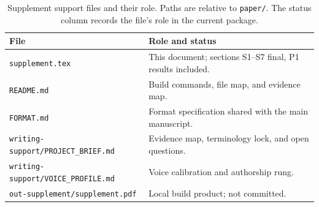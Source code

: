 \documentclass[a4paper,fleqn]{cas-sc}
\begin{document}
\begin{table}[pos=htbp]
  \centering
  \caption{Supplement support files and their role. Paths are relative to \texttt{paper/}. The
  status column records the file's role in the current package.}
  \label{tab:suppfiles}
  \small
  \begin{tabularx}{\textwidth}{>{\raggedright\arraybackslash}p{5.0cm}>{\raggedright\arraybackslash}X}
    \toprule
    \textbf{File} & \textbf{Role and status} \\
    \midrule
    \texttt{supplement.tex} & This document; sections S1--S7 final, P1 results included. \\
    \texttt{README.md} & Build commands, file map, and evidence map. \\
    \texttt{FORMAT.md} & Format specification shared with the main manuscript. \\
    \texttt{writing-support/\allowbreak PROJECT\_BRIEF.md} & Evidence map, terminology lock, and open questions. \\
    \texttt{writing-support/\allowbreak VOICE\_PROFILE.md} & Voice calibration and authorship rung. \\
    \texttt{out-supplement/supplement.pdf} & Local build product; not committed. \\
    \bottomrule
  \end{tabularx}
\end{table}
\end{document}
